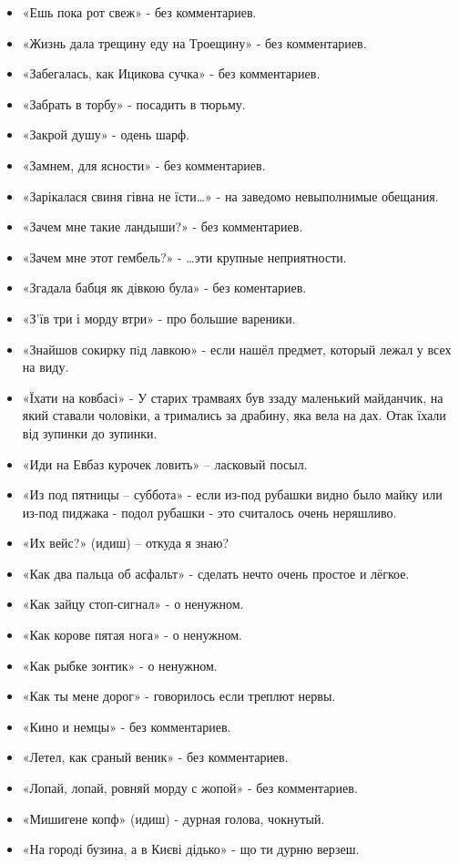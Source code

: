 \begin{itemize}
\item  «Ешь пока рот свеж» - без комментариев.
\item  «Жизнь дала трещину еду на Троещину» - без комментариев.
\item  «Забегалась, как Ицикова сучка» - без комментариев.
\item  «Забрать в торбу» -  посадить в тюрьму.
\item  «Закрой душу» - одень шарф.
\item  «Замнем, для ясности» - без комментариев.
\item  «Зарікалася свиня гівна не їсти…» - на заведомо невыполнимые обещания.
\item  «Зачем мне такие ландыши?» - без комментариев.
\item  «Зачем мне этот гембель?» - …эти крупные неприятности.
\item  «Згадала бабця як дівкою була» - без коментариев.
\item  «З'їв три і морду втри» - про большие вареники.
\item  «Знайшов сокирку пiд лавкою» - если нашёл предмет, который лежал у всех на виду.
\item  «Їхати на ковбасі» - У старих трамваях був ззаду маленький майданчик, на який ставали чоловіки, а тримались за драбину, яка вела на дах. Отак їхали від зупинки до зупинки.
\item  «Иди на Евбаз курочек ловить» – ласковый посыл.
\item  «Из под пятницы – суббота» - если из-под рубашки видно было майку или из-под пиджака - подол рубашки - это считалось очень неряшливо.
\item  «Их вейс?» (идиш) – откуда я знаю?
\item  «Как два пальца об асфальт» - сделать нечто очень простое и лёгкое.
\item  «Как зайцу стоп-сигнал» - о ненужном.
\item  «Как корове пятая нога» - о ненужном.
\item  «Как рыбке зонтик» - о ненужном.
\item  «Как ты мене дорог» - говорилось если треплют  нервы.
\item  «Кино и немцы» - без комментариев.
\item  «Летел, как сраный веник» - без комментариев.
\item  «Лопай, лопай, ровняй морду с жопой» - без комментариев.
\item  «Мишигене копф» (идиш) - дурная голова, чокнутый.
\item  «На городі бузина, а в Києві дідько» - що ти дурню верзеш.

\end{itemize}
